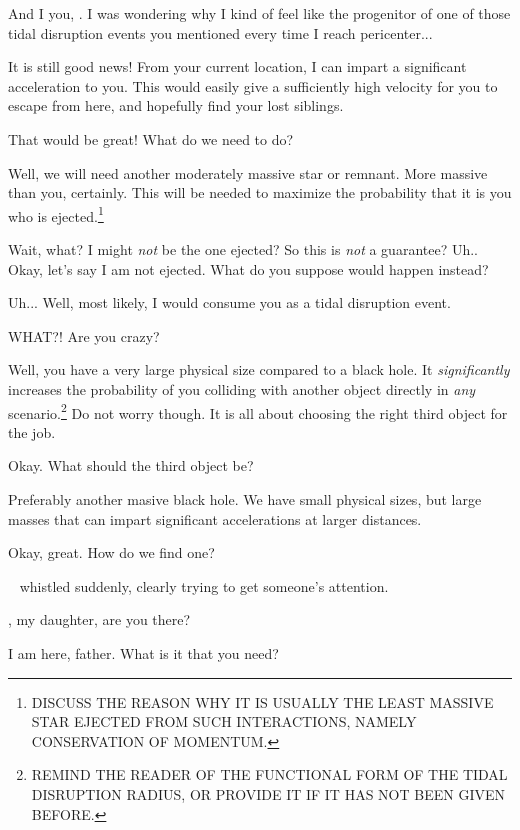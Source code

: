 \documentclass[main.tex]{subfiles}
\begin{document}
\newpara \Electra And I you, \rmchiron.  I was wondering why I kind of feel like the progenitor of one of those tidal disruption events you mentioned every time I reach pericenter...

\newpara \Chiron It is still good news!  From your current location, I can impart a significant acceleration to you.  This would easily give a sufficiently high velocity for you to escape from here, and hopefully find your lost siblings.

\newpara \Electra  That would be great!  What do we need to do?

\newpara \Chiron Well, we will need another moderately massive star or remnant.  More massive than you, certainly.  This will be needed to maximize the probability that it is you who is ejected.\footnote{DISCUSS THE REASON WHY IT IS USUALLY THE LEAST MASSIVE STAR EJECTED FROM SUCH INTERACTIONS, NAMELY CONSERVATION OF MOMENTUM.}

\newpara \Electra Wait, what?  I might \textit{not} be the one ejected?  So this is \textit{not} a guarantee?  Uh.. Okay, let's say I am not ejected.  What do you suppose would happen instead?

\newpara \Chiron Uh... Well, most likely, I would consume you as a tidal disruption event.

\newpara \Electra WHAT?!  Are you crazy? 

\newpara \Chiron Well, you have a very large physical size compared to a black hole.  It \textit{significantly} increases the probability of you colliding with another object directly in \textit{any} scenario.\footnote{REMIND THE READER OF THE FUNCTIONAL FORM OF THE TIDAL DISRUPTION RADIUS, OR PROVIDE IT IF IT HAS NOT BEEN GIVEN BEFORE.}  Do not worry though.  It is all about choosing the right third object for the job.  

\newpara \Electra Okay.  What should the third object be?

\newpara \Chiron Preferably another masive black hole.  We have small physical sizes, but large masses that can impart significant accelerations at larger distances.

\newpara \Electra Okay, great.  How do we find one?

\newpara \nar \rmchiron~ whistled suddenly, clearly trying to get someone's attention.

\newpara \Chiron \rmhippe, my daughter, are you there?

\newpara \Hippe I am here, father.  What is it that you need?
\end{document}
